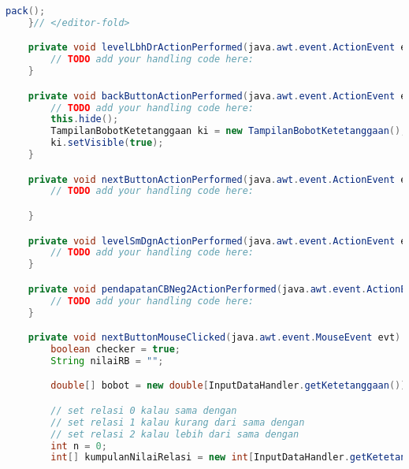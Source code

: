 \begin{lstlisting}[language=Java, caption=TampilanKondisiKetetanggaan.java]
        pack();
    }// </editor-fold>                        

    private void levelLbhDrActionPerformed(java.awt.event.ActionEvent evt) {                                           
        // TODO add your handling code here:
    }                                          

    private void backButtonActionPerformed(java.awt.event.ActionEvent evt) {                                           
        // TODO add your handling code here:
        this.hide();
        TampilanBobotKetetanggaan ki = new TampilanBobotKetetanggaan();
        ki.setVisible(true);
    }                                          

    private void nextButtonActionPerformed(java.awt.event.ActionEvent evt) {                                           
        // TODO add your handling code here:

    }                                          

    private void levelSmDgnActionPerformed(java.awt.event.ActionEvent evt) {                                           
        // TODO add your handling code here:
    }                                          

    private void pendapatanCBNeg2ActionPerformed(java.awt.event.ActionEvent evt) {                                                 
        // TODO add your handling code here:
    }                                                

    private void nextButtonMouseClicked(java.awt.event.MouseEvent evt) {                                        
        boolean checker = true;
        String nilaiRB = "";

        double[] bobot = new double[InputDataHandler.getKetetanggaan()];

        // set relasi 0 kalau sama dengan
        // set relasi 1 kalau kurang dari sama dengan
        // set relasi 2 kalau lebih dari sama dengan
        int n = 0;
        int[] kumpulanNilaiRelasi = new int[InputDataHandler.getKetetanggaan()];
        

\end{lstlisting}
